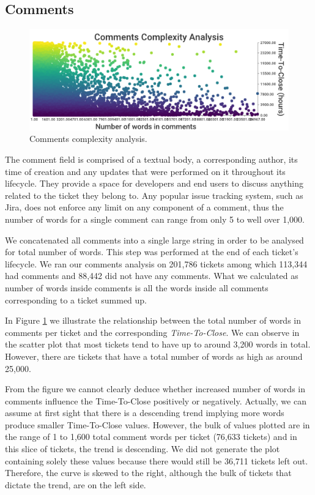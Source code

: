 \documentclass{mpaper}
\begin{document}
\subsection{Comments}

\begin{figure}[ht]
  \begin{center}
    \includegraphics[scale=0.25]{images/comment_complexity.png}
  \end{center}
  \caption{\label{comments}Comments complexity analysis.}
\end{figure}

The comment field is comprised of a textual body, a corresponding author, its time of creation and any updates 
that were performed on it throughout its lifecycle. They provide a space for developers and end users to discuss 
anything related to the ticket they belong to. Any popular issue tracking system, such as Jira, does not enforce 
any limit on any component of a comment, thus the number of words for a single comment can range from only 5 
to well over 1,000. 

We concatenated all comments into a single large string in order to be analysed for total number of words. This step 
was performed at the end of each ticket's lifecycle. We ran our comments analysis on 201,786 tickets among which 
113,344 had comments and 88,442 did not have any comments. What we calculated as number of words inside comments 
is all the words inside all comments corresponding to a ticket summed up.

In Figure \ref{comments} we illustrate the relationship between the total number of words in comments per ticket and 
the corresponding \emph{Time-To-Close}. We can observe in the scatter plot that most tickets tend to 
have up to around 3,200 words in total. However, there are tickets that have a total number of words as high as 
around 25,000. 

From the figure we cannot clearly deduce whether increased number of words in comments influence 
the Time-To-Close positively or negatively. Actually, we can assume at first sight that there is a descending trend implying more 
words produce smaller Time-To-Close values. However, the bulk of values plotted are in the range of 
1 to 1,600 total comment words per ticket (76,633 tickets) and in this slice of tickets, the trend is descending.
We did not generate the plot containing solely these values because there would still be 36,711 tickets left out. 
Therefore, the curve is skewed to the right, although the bulk of tickets that dictate the trend, are on the left side.
\end{document}
